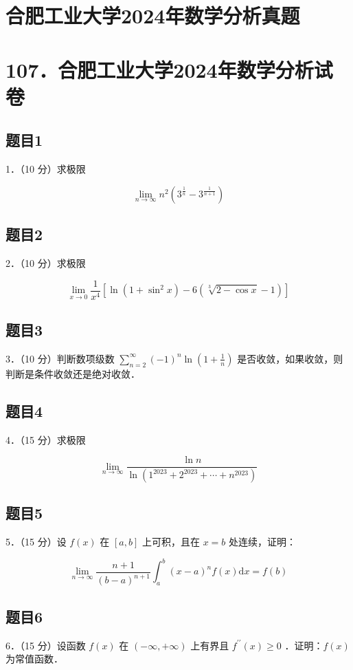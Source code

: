 \documentclass{article}
\begin{document}
\section*{合肥工业大学2024年数学分析真题}
\section*{107．合肥工业大学2024年数学分析试卷}

\subsection{题目1}
1．（10 分）求极限

\[
\lim _{n \rightarrow \infty} n^{2}\left(3^{\frac{1}{n}}-3^{\frac{1}{n+1}}\right)
\]

\subsection{题目2}
2．（10 分）求极限

\[
\lim _{x \rightarrow 0} \frac{1}{x^{4}}\left[\ln \left(1+\sin ^{2} x\right)-6(\sqrt[3]{2-\cos x}-1)\right]
\]

\subsection{题目3}
3．（10 分）判断数项级数 \(\sum_{n=2}^{\infty}(-1)^{n} \ln \left(1+\frac{1}{n}\right)\) 是否收敛，如果收敛，则判断是条件收敛还是绝对收敛．

\subsection{题目4}
4．（15 分）求极限

\[
\lim _{n \rightarrow \infty} \frac{\ln n}{\ln \left(1^{2023}+2^{2023}+\cdots+n^{2023}\right)}
\]

\subsection{题目5}
5．（15 分）设 \(f(x)\) 在 \([a, b]\) 上可积，且在 \(x=b\) 处连续，证明：

\[
\lim _{n \rightarrow \infty} \frac{n+1}{(b-a)^{n+1}} \int_{a}^{b}(x-a)^{n} f(x) \mathrm{d} x=f(b)
\]

\subsection{题目6}
6．（15 分）设函数 \(f(x)\) 在 \((-\infty,+\infty)\) 上有界且 \(f^{\prime \prime}(x) \geq 0\) ．证明：\(f(x)\) 为常值函数．
\end{document}
